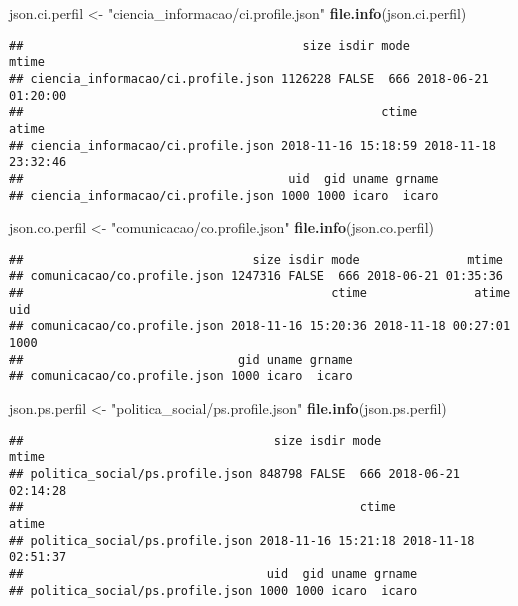 \documentclass[]{article}
\newenvironment{Shaded}{\begin{snugshade}}{\end{snugshade}}
\newcommand{\KeywordTok}[1]{\textcolor[rgb]{0.13,0.29,0.53}{\textbf{#1}}}
\newcommand{\StringTok}[1]{\textcolor[rgb]{0.31,0.60,0.02}{#1}}
\newcommand{\NormalTok}[1]{#1}
\begin{document}
\begin{Shaded}
\begin{Highlighting}[]
\NormalTok{json.ci.perfil <-}\StringTok{ "ciencia_informacao/ci.profile.json"}
\KeywordTok{file.info}\NormalTok{(json.ci.perfil)}
\end{Highlighting}
\end{Shaded}

\begin{verbatim}
##                                       size isdir mode               mtime
## ciencia_informacao/ci.profile.json 1126228 FALSE  666 2018-06-21 01:20:00
##                                                  ctime               atime
## ciencia_informacao/ci.profile.json 2018-11-16 15:18:59 2018-11-18 23:32:46
##                                     uid  gid uname grname
## ciencia_informacao/ci.profile.json 1000 1000 icaro  icaro
\end{verbatim}

\begin{Shaded}
\begin{Highlighting}[]
\NormalTok{json.co.perfil <-}\StringTok{ "comunicacao/co.profile.json"}
\KeywordTok{file.info}\NormalTok{(json.co.perfil)}
\end{Highlighting}
\end{Shaded}

\begin{verbatim}
##                                size isdir mode               mtime
## comunicacao/co.profile.json 1247316 FALSE  666 2018-06-21 01:35:36
##                                           ctime               atime  uid
## comunicacao/co.profile.json 2018-11-16 15:20:36 2018-11-18 00:27:01 1000
##                              gid uname grname
## comunicacao/co.profile.json 1000 icaro  icaro
\end{verbatim}

\begin{Shaded}
\begin{Highlighting}[]
\NormalTok{json.ps.perfil <-}\StringTok{ "politica_social/ps.profile.json"}
\KeywordTok{file.info}\NormalTok{(json.ps.perfil)}
\end{Highlighting}
\end{Shaded}

\begin{verbatim}
##                                   size isdir mode               mtime
## politica_social/ps.profile.json 848798 FALSE  666 2018-06-21 02:14:28
##                                               ctime               atime
## politica_social/ps.profile.json 2018-11-16 15:21:18 2018-11-18 02:51:37
##                                  uid  gid uname grname
## politica_social/ps.profile.json 1000 1000 icaro  icaro
\end{verbatim}
\end{document}
